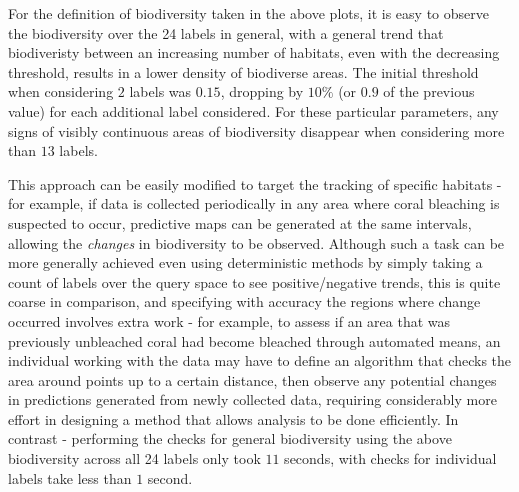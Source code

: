 For the definition of biodiversity taken in the above plots, it is easy to observe the biodiversity over the 24 labels in general, with a general trend that biodiveristy between an increasing number of habitats, even with the decreasing threshold, results in a lower density of biodiverse areas. The initial threshold when considering $2$ labels was $0.15$, dropping by $10\%$ (or $0.9$ of the previous value) for each additional label considered. For these particular parameters, any signs of visibly continuous areas of biodiversity disappear when considering more than $13$ labels.

This approach can be easily modified to target the tracking of specific habitats - for example, if data is collected periodically in any area where coral bleaching is suspected to occur, predictive maps can be generated at the same intervals, allowing the \textit{changes} in biodiversity to be observed. Although such a task can be more generally achieved even using deterministic methods by simply taking a count of labels over the query space to see positive/negative trends, this is quite coarse in comparison, and specifying with accuracy the regions where change occurred involves extra work - for example, to assess if an area that was previously unbleached coral had become bleached through automated means, an individual working with the data may have to define an algorithm that checks the area around points up to a certain distance, then observe any potential changes in predictions generated from newly collected data, requiring considerably more effort in designing a method that allows analysis to be done efficiently. In contrast - performing the checks for general biodiversity using the above biodiversity across all 24 labels only took $11$ seconds, with checks for individual labels take less than $1$ second.

